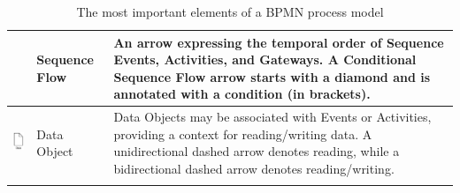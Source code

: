 \documentclass{article}
\begin{document}
\begin{longtable}{ | c | m{5cm} | m{5cm} | }
\begin{minipage}{.3\textwidth}
    \end{minipage}
    &
    Sequence Flow
    &
   An arrow expressing the temporal order of Sequence Events, Activities, and Gateways. A Conditional Sequence Flow arrow starts with a diamond and is annotated with a condition (in brackets).
 \\ \hline
 \begin{minipage}{.1\textwidth}
      \includegraphics[width=\linewidth]{data_object}
    \end{minipage}
    &
    Data Object
    &
   Data Objects may be associated with Events or Activities, providing a context for reading/writing data. A unidirectional dashed arrow denotes reading, while a bidirectional dashed arrow denotes reading/writing.
 \\ \hline
  \caption{The most important elements of a BPMN process model}
\end{longtable}
\end{document}
